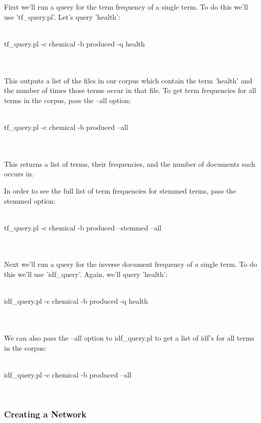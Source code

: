 First we'll run a query for the term frequency of a single term.  To do this we'll use 'tf\_query.pl'.  Let's query 'health':
\\
\\
\begin{boxedverbatim}
 tf_query.pl -c chemical -b produced -q health
\end{boxedverbatim}
\\
\\
This outputs a list of the files in our corpus which contain the term 'health' and the number of times those terms occur in that file.  To get term frequencies for all terms in the corpus, pass the --all option:
\\
\\
\begin{boxedverbatim}
 tf_query.pl -c chemical -b produced --all
\end{boxedverbatim}
\\
\\
This returns a list of terms, their frequencies, and the number of documents each occurs in.

In order to see the full list of term frequencies for stemmed terms, pass the stemmed option:
\\
\\
\begin{boxedverbatim}
 tf_query.pl -c chemical -b produced --stemmed --all
\end{boxedverbatim}
\\
\\
Next we'll run a query for the inverse document frequency of a single term.  To do this we'll use 'idf\_query'.  Again, we'll query 'health':
\\
\\
\begin{boxedverbatim}
 idf_query.pl -c chemical -b produced -q health
\end{boxedverbatim}
\\
\\
We can also pass the --all option to idf\_query.pl to get a list of idf's for all terms in the corpus:
\\
\\
\begin{boxedverbatim}
 idf_query.pl -c chemical -b produced --all
\end{boxedverbatim}
\\
\subsubsection{Creating a Network}



